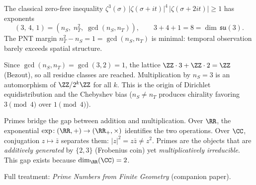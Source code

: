 \begin{theorem}
\label{thm:pnt_exponents}
The classical zero-free inequality $\zeta^3(\sigma)\,|\zeta(\sigma+it)|^4\,|\zeta(\sigma+2it)|\ge 1$ has exponents
\begin{equation}
\boxed{(3,\,4,\,1) = (n_S,\; n_T^2,\; \gcd(n_S,n_T)), \qquad 3+4+1 = 8 = \dim\,\mathfrak{su}(3).}
\end{equation}
The PNT margin $n_T^2 - n_S = 1 = \gcd(n_S,n_T)$ is minimal: temporal observation barely exceeds spatial structure.
\end{theorem}

\begin{theorem}[Equidistribution from $\gcd(2,3)=1$]
\label{thm:equidistrib}
Since $\gcd(n_S, n_T) = \gcd(3,2) = 1$, the lattice $\ZZ\cdot 3 + \ZZ\cdot 2 = \ZZ$ (Bezout), so all residue classes are reached.  Multiplication by $n_S=3$ is an automorphism of $\ZZ/2^k\ZZ$ for all $k$.  This is the origin of Dirichlet equidistribution and the Chebyshev bias ($n_S \neq n_T$ produces chirality favoring $3\!\pmod{4}$ over $1\!\pmod{4}$).
\end{theorem}

\begin{remark}
Primes bridge the gap between addition and multiplication.  Over $\RR$, the exponential $\exp\!: (\RR,+)\to(\RR_+,\times)$ identifies the two operations.  Over $\CC$, conjugation $z\mapsto\bar z$ separates them: $|z|^2 = z\bar z \neq z^2$.  Primes are the objects that are \emph{additively generated} by $\{2,3\}$ (Frobenius coin) yet \emph{multiplicatively irreducible}.  This gap exists because $\dim_\RR(\CC) = 2$.
\end{remark}

\noindent Full treatment: \textit{Prime Numbers from Finite Geometry} (companion paper).
